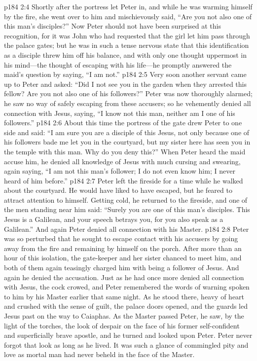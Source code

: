\vs p184 2:4 Shortly after the portress let Peter in, and while he was warming himself by the fire, she went over to him and mischievously said, “Are you not also one of this man’s disciples?” Now Peter should not have been surprised at this recognition, for it was John who had requested that the girl let him pass through the palace gates; but he was in such a tense nervous state that this identification as a disciple threw him off his balance, and with only one thought uppermost in his mind---the thought of escaping with his life---he promptly answered the maid’s question by saying, “I am not.”
\vs p184 2:5 Very soon another servant came up to Peter and asked: “Did I not see you in the garden when they arrested this fellow? Are you not also one of his followers?” Peter was now thoroughly alarmed; he saw no way of safely escaping from these accusers; so he vehemently denied all connection with Jesus, saying, “I know not this man, neither am I one of his followers.”
\vs p184 2:6 About this time the portress of the gate drew Peter to one side and said: “I am sure you are a disciple of this Jesus, not only because one of his followers bade me let you in the courtyard, but my sister here has seen you in the temple with this man. Why do you deny this?” When Peter heard the maid accuse him, he denied all knowledge of Jesus with much cursing and swearing, again saying, “I am not this man’s follower; I do not even know him; I never heard of him before.”
\vs p184 2:7 Peter left the fireside for a time while he walked about the courtyard. He would have liked to have escaped, but he feared to attract attention to himself. Getting cold, he returned to the fireside, and one of the men standing near him said: “Surely you are one of this man’s disciples. This Jesus is a Galilean, and your speech betrays you, for you also speak as a Galilean.” And again Peter denied all connection with his Master.
\vs p184 2:8 Peter was so perturbed that he sought to escape contact with his accusers by going away from the fire and remaining by himself on the porch. After more than an hour of this isolation, the gate\hyp{}keeper and her sister chanced to meet him, and both of them again teasingly charged him with being a follower of Jesus. And again he denied the accusation. Just as he had once more denied all connection with Jesus, the cock crowed, and Peter remembered the words of warning spoken to him by his Master earlier that same night. As he stood there, heavy of heart and crushed with the sense of guilt, the palace doors opened, and the guards led Jesus past on the way to Caiaphas. As the Master passed Peter, he saw, by the light of the torches, the look of despair on the face of his former self\hyp{}confident and superficially brave apostle, and he turned and looked upon Peter. Peter never forgot that look as long as he lived. It was such a glance of commingled pity and love as mortal man had never beheld in the face of the Master.
